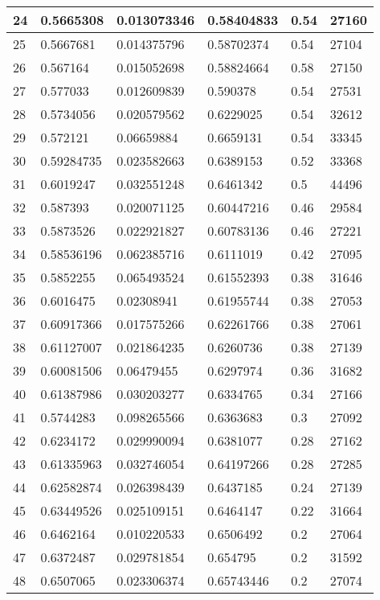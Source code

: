 \begin{longtable}{|l|l|l|l|l|l|}
24 & 0.5665308 & 0.013073346 & 0.58404833 & 0.54 & 27160 \\ \hline 
25 & 0.5667681 & 0.014375796 & 0.58702374 & 0.54 & 27104 \\ \hline 
26 & 0.567164 & 0.015052698 & 0.58824664 & 0.58 & 27150 \\ \hline 
27 & 0.577033 & 0.012609839 & 0.590378 & 0.54 & 27531 \\ \hline 
28 & 0.5734056 & 0.020579562 & 0.6229025 & 0.54 & 32612 \\ \hline 
29 & 0.572121 & 0.06659884 & 0.6659131 & 0.54 & 33345 \\ \hline 
30 & 0.59284735 & 0.023582663 & 0.6389153 & 0.52 & 33368 \\ \hline 
31 & 0.6019247 & 0.032551248 & 0.6461342 & 0.5 & 44496 \\ \hline 
32 & 0.587393 & 0.020071125 & 0.60447216 & 0.46 & 29584 \\ \hline 
33 & 0.5873526 & 0.022921827 & 0.60783136 & 0.46 & 27221 \\ \hline 
34 & 0.58536196 & 0.062385716 & 0.6111019 & 0.42 & 27095 \\ \hline 
35 & 0.5852255 & 0.065493524 & 0.61552393 & 0.38 & 31646 \\ \hline 
36 & 0.6016475 & 0.02308941 & 0.61955744 & 0.38 & 27053 \\ \hline 
37 & 0.60917366 & 0.017575266 & 0.62261766 & 0.38 & 27061 \\ \hline 
38 & 0.61127007 & 0.021864235 & 0.6260736 & 0.38 & 27139 \\ \hline 
39 & 0.60081506 & 0.06479455 & 0.6297974 & 0.36 & 31682 \\ \hline 
40 & 0.61387986 & 0.030203277 & 0.6334765 & 0.34 & 27166 \\ \hline 
41 & 0.5744283 & 0.098265566 & 0.6363683 & 0.3 & 27092 \\ \hline 
42 & 0.6234172 & 0.029990094 & 0.6381077 & 0.28 & 27162 \\ \hline 
43 & 0.61335963 & 0.032746054 & 0.64197266 & 0.28 & 27285 \\ \hline 
44 & 0.62582874 & 0.026398439 & 0.6437185 & 0.24 & 27139 \\ \hline 
45 & 0.63449526 & 0.025109151 & 0.6464147 & 0.22 & 31664 \\ \hline 
46 & 0.6462164 & 0.010220533 & 0.6506492 & 0.2 & 27064 \\ \hline 
47 & 0.6372487 & 0.029781854 & 0.654795 & 0.2 & 31592 \\ \hline 
48 & 0.6507065 & 0.023306374 & 0.65743446 & 0.2 & 27074 \\ \hline 

\end{longtable}
